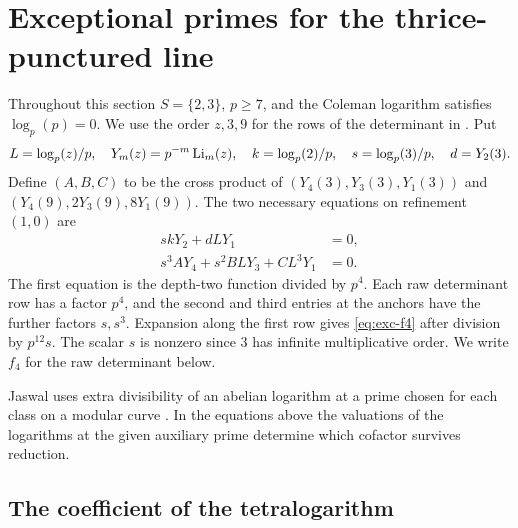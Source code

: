 \section{Exceptional primes for the thrice-punctured line}\label{sec:exceptional}

Throughout this section $S=\{2,3\}$, $p\ge7$, and the Coleman
logarithm satisfies $\log_p(p)=0$. We use the order $z,3,9$ for
the rows of the determinant in \cite[(6.2)]{Ludtke}. Put
\[
 L=\log_p(z)/p,\quad Y_m(z)=p^{-m}\operatorname{Li}_m(z),\quad
 k=\log_p(2)/p,\quad s=\log_p(3)/p,\quad d=Y_2(3).
\]
Define $(A,B,C)$ to be the cross product of
$(Y_4(3),Y_3(3),Y_1(3))$ and $(Y_4(9),2Y_3(9),8Y_1(9))$.
The two necessary equations on refinement $(1,0)$ are
\begin{align}
 skY_2+dLY_1&=0,\label{eq:exc-f2}\\
 s^3AY_4+s^2BLY_3+CL^3Y_1&=0.\label{eq:exc-f4}
\end{align}
The first equation is the depth-two function divided by $p^4$.
Each raw determinant row has a factor $p^4$, and the second and
third entries at the anchors have the further factors $s,s^3$.
Expansion along the first row gives \eqref{eq:exc-f4} after division
by $p^{12}s$. The scalar $s$ is nonzero since $3$ has infinite
multiplicative order. We write $f_4$ for the raw determinant below.

Jaswal uses extra divisibility of an abelian logarithm at a prime chosen
for each class on a modular curve \cite{Jaswal}. In the equations above
the valuations of the logarithms at the given auxiliary prime determine
which cofactor survives reduction.

\subsection{The coefficient of the tetralogarithm}

